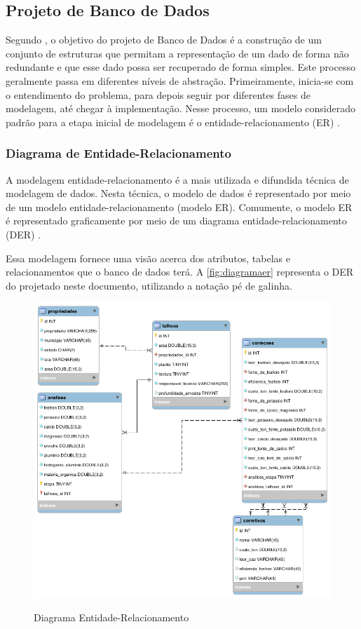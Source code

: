 \subsection{Projeto de Banco de Dados}
\label{sec:titSecBancoDados}

Segundo , o objetivo do projeto de Banco de Dados é a construção de um conjunto de estruturas que permitam a representação de um dado de forma não redundante e que esse dado possa ser recuperado de forma simples. Este processo geralmente passa em diferentes níveis de abstração. Primeiramente, inicia-se com o entendimento do problema, para depois seguir por diferentes fases de modelagem, até chegar à implementação. Nesse processo, um modelo considerado padrão para a etapa inicial de modelagem é o entidade-relacionamento (ER) \cite{heuser2009projeto}.

\subsubsection{Diagrama de Entidade-Relacionamento}
\label{sec:titSecDiagER}

A modelagem entidade-relacionamento é a mais utilizada e difundida técnica de modelagem de dados. Nesta técnica, o modelo de dados é representado por meio de um modelo entidade-relacionamento (modelo ER). Comumente, o modelo ER é representado graficamente por meio de um diagrama entidade-relacionamento (DER) \cite{heuser2009projeto}.

Essa modelagem fornece uma visão acerca dos atributos, tabelas e relacionamentos que o banco de dados terá. A \autoref{fig:diagramaer} representa o DER do projetado neste documento, utilizando a notação pé de galinha.

\begin{figure}[H]
    \centering
    \caption{Diagrama Entidade-Relacionamento}
    \includegraphics[width=13cm]{dados/figuras/diagramaer.png}
    \label{fig:diagramaer}
\end{figure}

